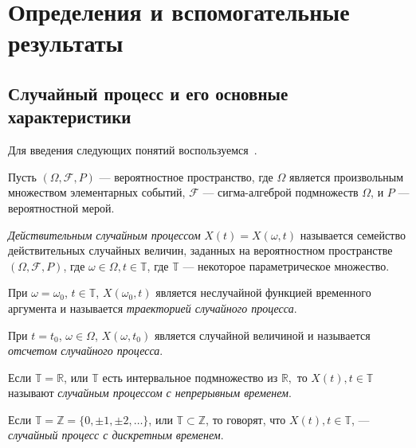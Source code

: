 
\newpage
\chapter{Определения и вспомогательные результаты}
\label{c:definitions}

\section{Случайный процесс и его основные характеристики}

Для введения следующих понятий воспользуемся~\cite{brillinjer-ts, trush-ts}.

Пусть $ (\Omega, \mathcal{F}, P) $ --- вероятностное пространство, где $\Omega$ является произвольным множеством элементарных событий, $\mathcal{F}$ --- сигма-алгеброй подмножеств $\Omega$, и $P$ --- вероятностной мерой.

\begin{Definition}
\label{def:stochastic-process}
	\textit{Действительным случайным процессом} $ X(t) = X(\omega, t) $ называется семейство действительных случайных величин, заданных на вероятностном пространстве $ (\Omega, \mathcal{F}, P) $, где $ \omega \in \Omega, t \in \mathbb{T}$, где $ \mathbb{T} $ --- некоторое параметрическое множество.

	При $ \omega = \omega_{0} $, $ t \in \mathbb{T} $, $ X(\omega_{0}, t) $ является неслучайной функцией временного аргумента и называется \textit{траекторией случайного процесса}.

	При $ t = t_{0} $, $ \omega \in \Omega $, $ X(\omega, t_{0}) $ является случайной величиной и называется \textit{отсчетом случайного процесса}.
\end{Definition}

\begin{Definition}%
    Если $ \mathbb{T} = \mathbb{R} $, или $ \mathbb{T} $ есть интервальное подмножество из $ \mathbb{R}, $ то $ X(t), t \in \mathbb{T} $ называют \textit{случайным процессом с непрерывным временем}.
\end{Definition}

\begin{Definition}
	Если $ \mathbb{T} = \mathbb{Z} = \{ 0, \pm 1, \pm 2, \dots \} $, или $ \mathbb{T} \subset \mathbb{Z} $, то говорят, что $ X(t), t \in \mathbb{T} $, --- \textit{случайный процесс с дискретным временем}.
\end{Definition}

